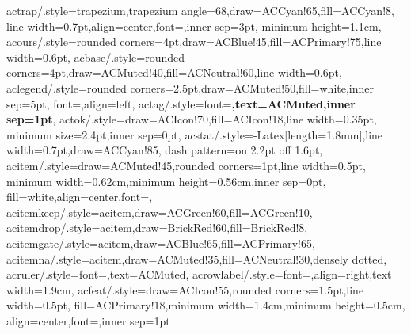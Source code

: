 {  actrap/.style={trapezium,trapezium angle=68,draw=ACCyan!65,fill=ACCyan!8,
                 line width=0.7pt,align=center,font=\scriptsize,inner sep=3pt,
                 minimum height=1.1cm},
  acours/.style={rounded corners=4pt,draw=ACBlue!45,fill=ACPrimary!75,line width=0.6pt},
  acbase/.style={rounded corners=4pt,draw=ACMuted!40,fill=ACNeutral!60,line width=0.6pt},
  aclegend/.style={rounded corners=2.5pt,draw=ACMuted!50,fill=white,inner sep=5pt,
                   font=\scriptsize,align=left},
  actag/.style={font=\tiny\bfseries,text=ACMuted,inner sep=1pt},
  actok/.style={draw=ACIcon!70,fill=ACIcon!18,line width=0.35pt,
                minimum size=2.4pt,inner sep=0pt},
  acstat/.style={-{Latex[length=1.8mm]},line width=0.7pt,draw=ACCyan!85,
                 dash pattern=on 2.2pt off 1.6pt},
  acitem/.style={draw=ACMuted!45,rounded corners=1pt,line width=0.5pt,
                 minimum width=0.62cm,minimum height=0.56cm,inner sep=0pt,
                 fill=white,align=center,font=\small},
  acitemkeep/.style={acitem,draw=ACGreen!60,fill=ACGreen!10},
  acitemdrop/.style={acitem,draw=BrickRed!60,fill=BrickRed!8},
  acitemgate/.style={acitem,draw=ACBlue!65,fill=ACPrimary!65},
  acitemna/.style={acitem,draw=ACMuted!35,fill=ACNeutral!30,densely dotted},
  acruler/.style={font=\tiny,text=ACMuted},
  acrowlabel/.style={font=\scriptsize,align=right,text width=1.9cm},
  acfeat/.style={draw=ACIcon!55,rounded corners=1.5pt,line width=0.5pt,
                 fill=ACPrimary!18,minimum width=1.4cm,minimum height=0.5cm,
                 align=center,font=\tiny,inner sep=1pt}
}

